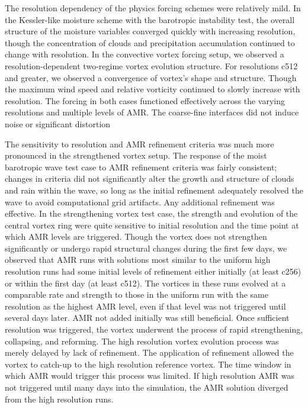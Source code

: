 The resolution
dependency of the physics forcing schemes were relatively mild.
In the Kessler-like
moisture scheme with the barotropic instability test, 
the overall structure of the moisture variables converged quickly
with increasing resolution, though the concentration of clouds and
precipitation accumulation continued to change with resolution. In
the convective vortex forcing setup, we observed a resolution-dependent
two-regime vortex evolution structure. For resolutions c512 and greater,
we observed a convergence of vortex's shape and structure. Though
the maximum wind speed and relative
vorticity continued to slowly increase with resolution.
The forcing in both cases functioned effectively across the varying
resolutions and multiple levels of AMR. The coarse-fine interfaces
did not induce noise or significant distortion 

The sensitivity to resolution and AMR refinement criteria was much
more pronounced in the strengthened vortex setup.
The response of the moist barotropic wave test case to 
AMR refinement criteria was fairly consistent; changes in criteria
did not significantly alter the growth and structure of clouds and rain within the wave,
so long as the initial refinement adequately resolved the wave to avoid
computational grid artifacts. Any additional refinement was effective.
In the strengthening vortex test case, the strength and evolution 
of the central vortex ring were quite sensitive to initial resolution and the time point at which
AMR levels are triggered. Though the vortex does not strengthen 
significantly or undergo rapid structural changes during the first few days, 
we observed that AMR runs with solutions most similar to the uniform high
resolution runs had some initial levels of refinement either initially (at least c256) or within
the first day (at least c512). The vortices in these runs evolved at a comparable rate
and strength to those in the uniform run with the same resolution
as the highest AMR level, even if that level was not triggered until several days later.
AMR not added initially was still beneficial.
Once sufficient resolution was triggered, the vortex underwent the process of 
rapid strengthening, collapsing, and reforming. The high resolution vortex evolution process was merely delayed by lack of refinement. 
The application of refinement allowed the vortex to catch-up to the high resolution reference vortex.
The time window in which AMR would trigger this process was limited.
If high resolution AMR was not triggered until many days into the simulation, 
the AMR solution diverged from the high resolution runs.

